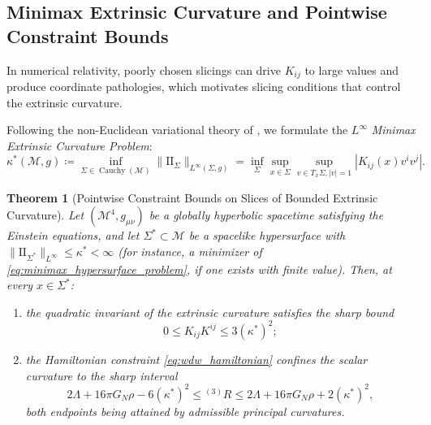\documentclass[11pt,a4paper,reqno]{amsart}
\newtheorem{theorem}{Theorem}[section]
\theoremstyle{definition}
\numberwithin{equation}{section}
\providecommand{\II}{\mathrm{I\!I}}
\providecommand{\II}{\mathrm{II}}
\begin{document}
\subsection{Minimax Extrinsic Curvature and Pointwise Constraint Bounds}
In numerical relativity, poorly chosen slicings can drive $K_{ij}$ to large values and produce coordinate pathologies, which motivates slicing conditions that control the extrinsic curvature.

Following the non-Euclidean variational theory of \cite{silvafilho2026noneuclidean}, we formulate the $L^\infty$ \emph{Minimax Extrinsic Curvature Problem}:
\begin{equation}
    \label{eq:minimax_hypersurface_problem}
    \kappa^*(\mathcal{M}, g) \coloneqq \inf_{\Sigma \in \operatorname{Cauchy}(\mathcal{M})} \|\II_\Sigma\|_{L^\infty(\Sigma, g)} = \inf_\Sigma \sup_{x \in \Sigma} \sup_{v \in T_x \Sigma, |v|=1} |K_{ij}(x) v^i v^j|.
\end{equation}

\begin{theorem}[Pointwise Constraint Bounds on Slices of Bounded Extrinsic Curvature]
\label{thm:minimax_hamiltonian_regularization}
Let $(\mathcal{M}^4, g_{\mu\nu})$ be a globally hyperbolic spacetime satisfying the Einstein equations, and let $\Sigma^* \subset \mathcal{M}$ be a spacelike hypersurface with $\|\II_{\Sigma^*}\|_{L^\infty} \le \kappa^* < \infty$ (for instance, a minimizer of \eqref{eq:minimax_hypersurface_problem}, \emph{if} one exists with finite value). Then, at every $x \in \Sigma^*$:
\begin{enumerate}[label=(\roman*)]
    \item the quadratic invariant of the extrinsic curvature satisfies the sharp bound
    \begin{equation}
        \label{eq:shear_bound}
        0 \le K_{ij} K^{ij} \le 3 (\kappa^*)^2;
    \end{equation}
    \item the Hamiltonian constraint \eqref{eq:wdw_hamiltonian} confines the scalar curvature to the sharp interval
    \begin{equation}
        \label{eq:curvature_bound}
        2\Lambda + 16\pi G_N\rho - 6 (\kappa^*)^2 \le {}^{(3)}R \le 2\Lambda + 16\pi G_N\rho + 2(\kappa^*)^2,
    \end{equation}
    both endpoints being attained by admissible principal curvatures.
\end{enumerate}
\end{theorem}
\end{document}

